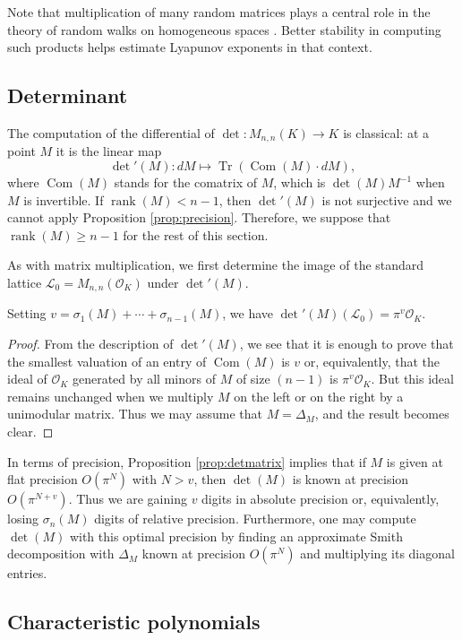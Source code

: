 \documentclass{sig-alternate}
\DeclareMathOperator{\tr}{Tr}
\DeclareMathOperator{\com}{Com}
\DeclareMathOperator{\rank}{rank}
\renewcommand{\O}{\mathcal O}
\newcommand{\detp}{\det{'}}
\begin{document}
Note that multiplication of many random matrices plays a central
role in the theory of random walks on homogeneous spaces \cite{Benoist:2012}.
Better stability in computing such products helps estimate
Lyapunov exponents in that context.

\subsection{Determinant}
\label{ssec:det}

The computation of the differential of $\det : M_{n,n}(K) \to K$
is classical: at a point $M$ it is the linear map
\[
\detp(M) : dM \mapsto \tr(\com(M) \cdot dM),
\]
where $\com(M)$ stands for the comatrix of $M$, which is $\det(M) M^{-1}$ when $M$ is invertible. If $\rank(M) < n - 1$,
then $\detp(M)$ is not surjective and we cannot apply Proposition 
\ref{prop:precision}. Therefore, we suppose that $\rank(M) \ge n-1$ for the rest of this section.

As with matrix multiplication, we first determine the image of
the standard lattice $\mathcal L_0 = M_{n,n}(\O_K)$ under $\detp(M)$.

\begin{prop}
\label{prop:detmatrix}
Setting $v = \sigma_1(M) + \cdots + \sigma_{n-1}(M)$, we have
$\detp(M)(\mathcal L_0) = \pi^v \O_K$.
\end{prop}

\begin{proof}
From the description of $\detp(M)$, we see that it is enough to prove 
that the smallest valuation of an entry of $\com(M)$ is $v$
or, equivalently, that the ideal of $\O_K$ generated by all 
minors of $M$ of size $(n-1)$ is $\pi^v
\O_K$. But this ideal remains unchanged when we multiply $M$ 
on the left or on the right by a unimodular matrix. Thus we may 
assume that $M = \Delta_M$, and the result becomes clear.
\end{proof}

In terms of precision, Proposition \ref{prop:detmatrix} implies that if 
$M$ is given at flat precision $O(\pi^N)$ with $N > v$, then $\det(M)$ 
is known at precision $O(\pi^{N+v})$.  Thus we are gaining $v$  
digits in absolute precision or, equivalently, losing $\sigma_n(M)$ digits
of relative precision.
Furthermore, one may compute $\det(M)$ with this optimal precision by finding an approximate
Smith decomposition with $\Delta_M$ known at precision $O(\pi^N)$ and
multiplying its diagonal entries. 

\subsection{Characteristic polynomials} \label{ssec:charpoly}
\end{document}
